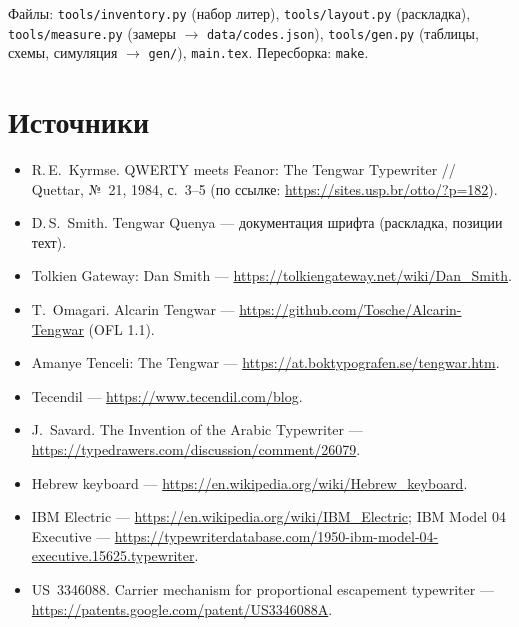 \documentclass[11pt,a4paper]{article}
\newcommand\code[1]{\texttt{#1}}
\begin{document}
Файлы: \code{tools/inventory.py} (набор литер), \code{tools/layout.py} (раскладка), \code{tools/measure.py} (замеры $\to$ \code{data/codes.json}), \code{tools/gen.py} (таблицы, схемы, симуляция $\to$ \code{gen/}), \code{main.tex}. Пересборка: \code{make}.

\section*{Источники}
\begin{itemize}\small
  \item R.\,E.~Kyrmse. QWERTY meets Feanor: The Tengwar Typewriter // Quettar, №~21, 1984, с.~3--5 (по ссылке: \url{https://sites.usp.br/otto/?p=182}).
  \item D.\,S.~Smith. Tengwar Quenya — документация шрифта (раскладка, позиции техт).
  \item Tolkien Gateway: Dan Smith — \url{https://tolkiengateway.net/wiki/Dan_Smith}.
  \item T.~Omagari. Alcarin Tengwar — \url{https://github.com/Tosche/Alcarin-Tengwar} (OFL 1.1).
  \item Amanye Tenceli: The Tengwar — \url{https://at.boktypografen.se/tengwar.htm}.
  \item Tecendil — \url{https://www.tecendil.com/blog}.
  \item J.~Savard. The Invention of the Arabic Typewriter — \url{https://typedrawers.com/discussion/comment/26079}.
  \item Hebrew keyboard — \url{https://en.wikipedia.org/wiki/Hebrew_keyboard}.
  \item IBM Electric — \url{https://en.wikipedia.org/wiki/IBM_Electric}; IBM Model 04 Executive — \url{https://typewriterdatabase.com/1950-ibm-model-04-executive.15625.typewriter}.
  \item US~3346088. Carrier mechanism for proportional escapement typewriter — \url{https://patents.google.com/patent/US3346088A}.
\end{itemize}
\end{document}
